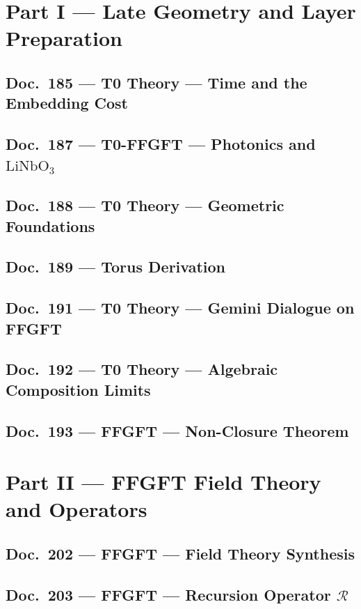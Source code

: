 	\part{Part I --- Late Geometry and Layer Preparation}
	\chapter{Doc.~185 --- T0 Theory — Time and the Embedding Cost}
	
	\chapter{Doc.~187 --- T0-FFGFT — Photonics and $\mathrm{LiNbO}_3$}
	
	\chapter{Doc.~188 --- T0 Theory — Geometric Foundations}
	
	\chapter{Doc.~189 --- Torus Derivation}
	
	\chapter{Doc.~191 --- T0 Theory — Gemini Dialogue on FFGFT}
	
	\chapter{Doc.~192 --- T0 Theory — Algebraic Composition Limits}
	
	\chapter{Doc.~193 --- FFGFT — Non-Closure Theorem}
	
	\part{Part II --- FFGFT Field Theory and Operators}
	\chapter{Doc.~202 --- FFGFT — Field Theory Synthesis}
	
	\chapter{Doc.~203 --- FFGFT — Recursion Operator $\mathcal{R}$}
	
